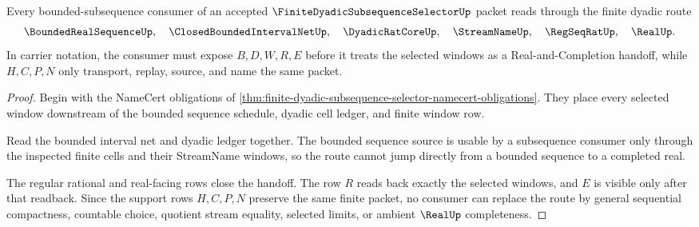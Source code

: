 \begin{theorem}
\label{thm:finite-dyadic-subsequence-selector-bounded-window-handoff}
Every bounded-subsequence consumer of an accepted $\FiniteDyadicSubsequenceSelectorUp$ packet reads through the finite dyadic route
$$
\BoundedRealSequenceUp,\quad
\ClosedBoundedIntervalNetUp,\quad
\DyadicRatCoreUp,\quad
\StreamNameUp,\quad
\RegSeqRatUp,\quad
\RealUp .
$$
In carrier notation, the consumer must expose $B,D,W,R,E$ before it treats the selected windows as a Real-and-Completion handoff, while $H,C,P,N$ only transport, replay, source, and name the same packet.
\end{theorem}
\begin{proof}
Begin with the NameCert obligations of \autoref{thm:finite-dyadic-subsequence-selector-namecert-obligations}. They place every selected window downstream of the bounded sequence schedule, dyadic cell ledger, and finite window row.

Read the bounded interval net and dyadic ledger together. The bounded sequence source is usable by a subsequence consumer only through the inspected finite cells and their StreamName windows, so the route cannot jump directly from a bounded sequence to a completed real.

The regular rational and real-facing rows close the handoff. The row $R$ reads back exactly the selected windows, and $E$ is visible only after that readback. Since the support rows $H,C,P,N$ preserve the same finite packet, no consumer can replace the route by general sequential compactness, countable choice, quotient stream equality, selected limits, or ambient $\RealUp$ completeness.
\end{proof}


\begin{closurestatus}{\FiniteDyadicSubsequenceSelectorUp}
  \theoryclosure{\seedClosure}
  \formalstatus{\unformalizedV}
\end{closurestatus}

